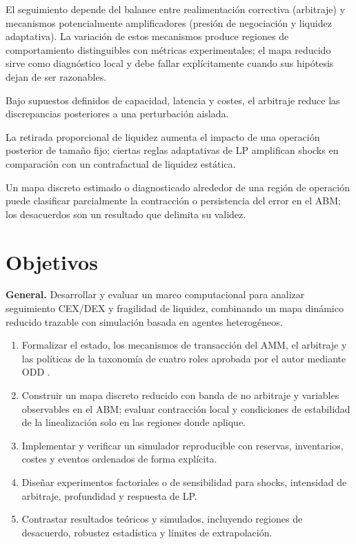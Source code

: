 El seguimiento depende del balance entre realimentación correctiva (arbitraje) y
mecanismos potencialmente amplificadores (presión de negociación y liquidez
adaptativa). La variación de estos mecanismos produce regiones de comportamiento
distinguibles con métricas experimentales; el mapa reducido sirve como diagnóstico
local y debe fallar explícitamente cuando sus hipótesis dejan de ser razonables.

\begin{description}[style=nextline]
  \item[H1a.] Bajo supuestos definidos de capacidad, latencia y costes, el arbitraje
    reduce las discrepancias posteriores a una perturbación aislada.
  \item[H1b.] La retirada proporcional de liquidez aumenta el impacto de una operación
    posterior de tamaño fijo; ciertas reglas adaptativas de LP amplifican shocks en
    comparación con un contrafactual de liquidez estática.
  \item[H1c.] Un mapa discreto estimado o diagnosticado alrededor de una región de
    operación puede clasificar parcialmente la contracción o persistencia del error en
    el ABM; los desacuerdos son un resultado que delimita su validez.
\end{description}

\section{Objetivos}

\textbf{General.} Desarrollar y evaluar un marco computacional para analizar seguimiento
CEX/DEX y fragilidad de liquidez, combinando un mapa dinámico reducido trazable con
simulación basada en agentes heterogéneos.

\begin{enumerate}
  \item Formalizar el estado, los mecanismos de transacción del AMM, el arbitraje y las
    políticas de la taxonomía de cuatro roles aprobada por el autor mediante ODD \cite{grimm2020odd}.
  \item Construir un mapa discreto reducido con banda de no arbitraje y variables
    observables en el ABM; evaluar contracción local y condiciones de estabilidad de la
    linealización solo en las regiones donde aplique.
  \item Implementar y verificar un simulador reproducible con reservas, inventarios,
    costes y eventos ordenados de forma explícita.
  \item Diseñar experimentos factoriales o de sensibilidad para shocks, intensidad de
    arbitraje, profundidad y respuesta de LP.
  \item Contrastar resultados teóricos y simulados, incluyendo regiones de desacuerdo,
    robustez estadística y límites de extrapolación.
\end{enumerate}
